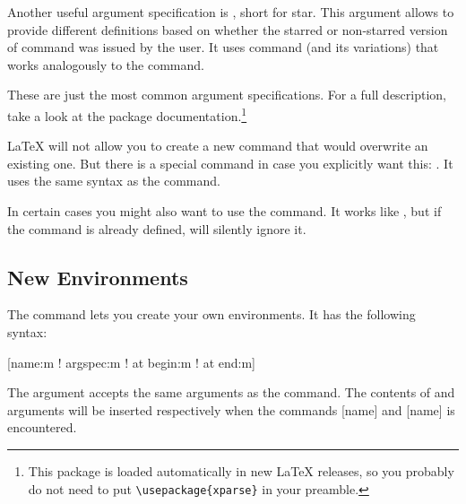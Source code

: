 Another useful argument specification is , short for star. This
argument allows to provide different definitions based on whether the
starred or non-starred version of command was issued by the user. It uses
 command (and its variations)
that works analogously to the  command. 


These are just the most common argument specifications. For a full description,
take a look at the  package documentation.\footnote{This
package is loaded automatically in new \LaTeX{} releases, so you probably do not
need to put \texttt{\textbackslash usepackage\{xparse\}} in your preamble. }

\LaTeX{} will not allow you to create a new command that would
overwrite an existing one. But there is a special command in case you
explicitly want this: .
It uses the same syntax as the 
command.

In certain cases you might also want to use the 
command. It works like , but if the command is
already defined, \LaTeXe{} will silently ignore it.

\subsection{New Environments}
The  command lets you create your own environments. It has the
following syntax:

\begin{lscommand}
[name:m ! argspec:m ! at begin:m ! at end:m]
\end{lscommand}

The  argument accepts the same arguments as the
 command. The contents of  and  arguments will be inserted respectively when the commands
[name] and [name] is encountered.

